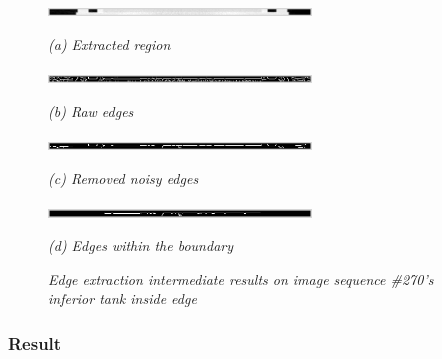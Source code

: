 \begin{figure}[htb]
  \begin{minipage}[t]{2.75in}
    \centering
    \centerline{\mbox{\includegraphics[width=2.75in]{data_extraction/images/sample/20121017_270/Coronal/inferior_inside/1_region.eps}}}
    \centerline{\emph{(a) Extracted region}}
  \end{minipage}\medskip
  \begin{minipage}[t]{2.75in}
    \centerline{\mbox{\includegraphics[width=2.75in]{data_extraction/images/sample/20121017_270/Coronal/inferior_inside/2_raw_edges.eps}}}
    \centerline{\emph{(b) Raw edges}}
  \end{minipage}
  \begin{minipage}[t]{2.75in}
    \centerline{\mbox{\includegraphics[width=2.75in]{data_extraction/images/sample/20121017_270/Coronal/inferior_inside/3_removed_noise.eps}}}
    \centerline{\emph{(c) Removed noisy edges}}
  \end{minipage}\medskip
  \begin{minipage}[t]{2.75in}
    \centerline{\mbox{\includegraphics[width=2.75in]{data_extraction/images/sample/20121017_270/Coronal/inferior_inside/4_within_boundary.eps}}}
    \centerline{\emph{(d) Edges within the boundary}}
  \end{minipage}
  \caption{\emph{Edge extraction intermediate results on image sequence \#270's inferior tank inside edge}}
  \label{fig:coronal_270_intermediate_results}
\end{figure}

\subsubsection{Result}

